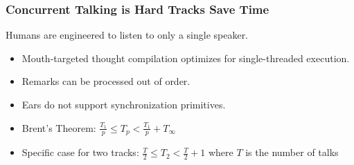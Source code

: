 \documentclass{beamer}
\begin{document}
\begin{frame}
\frametitle{
\color{blue} Concurrent Talking is Hard
\color{red} \hspace{-12.4em} Tracks Save Time
}
\vspace{-1em}
{
\color{blue}
Humans are engineered to listen to only a single speaker.
\vspace{1em}
\begin{itemize}
\color{blue}
\item Mouth-targeted thought compilation optimizes for single-threaded
execution.
\item Remarks can be processed out of order.
\item Ears do not support synchronization primitives.
\end{itemize}
}
{
\vspace{-7em}
\begin{itemize}
\color{red}
\item Brent's Theorem: $\frac{T_1}{p} \leq T_p < \frac{T_1}{p} + T_\infty$
\item Specific case for two tracks:
$\frac{T}{2} \leq T_2 < \frac{T}{2} + 1$
where $T$ is the number of talks
\end{itemize}
}
\end{frame}
\end{document}
